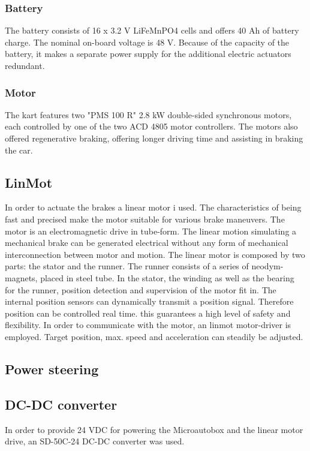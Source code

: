 \subsubsection{Battery}
The battery consists of 16 x 3.2 V LiFeMnPO4 cells and offers 40 Ah of battery charge. The nominal on-board voltage is 48 V. Because of the capacity of the battery, it makes a separate power supply for the additional electric actuators redundant.

\subsubsection{Motor}
The kart features two "PMS 100 R" 2.8 kW double-sided synchronous motors, each controlled by one of the two ACD 4805 motor controllers. The motors also offered regenerative braking, offering longer driving time and assisting in braking the car.

\subsection{LinMot}
In order to actuate the brakes a linear motor i used. The characteristics of being fast and precised make the motor suitable for various brake maneuvers. The motor is an electromagnetic drive in tube-form. The linear motion simulating a mechanical brake can be generated electrical without any form of mechanical interconnection between motor and motion. The linear motor is composed by two parts: the stator and the runner. The runner consists of a series of neodym-magnets, placed in steel tube. In the stator, the winding as well as the bearing for the runner, position detection and supervision of the motor fit in.
The internal position sensors can dynamically transmit a position signal. Therefore position can be controlled real time. this guarantees a high level of safety and flexibility. 
In order to communicate with the motor, an linmot motor-driver is employed. Target position, max. speed and acceleration can steadily be adjusted.


\subsection{Power steering}

\subsection{DC-DC converter}
In order to provide 24 VDC for powering the Microautobox and the linear motor drive, an SD-50C-24 DC-DC converter was used.

